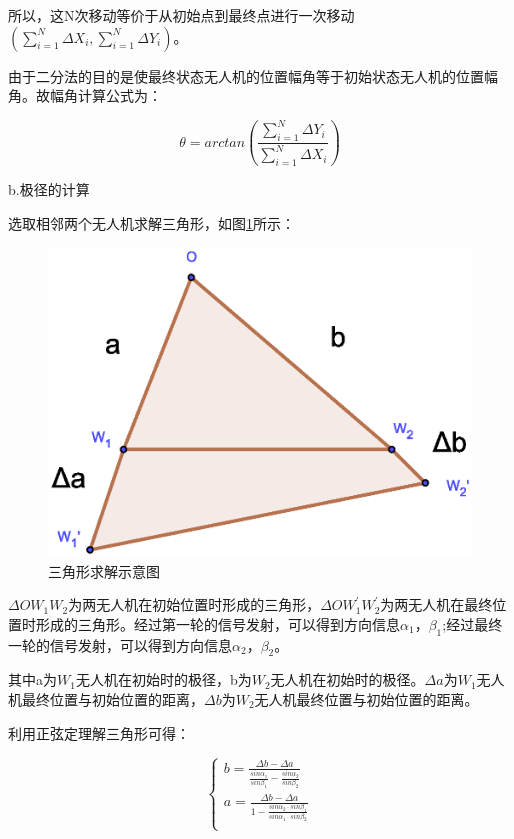 \documentclass{ctexart}
\begin{document}
所以，这N次移动等价于从初始点到最终点进行一次移动$(\sum_{i=1}^{N}\Delta X_i,\sum_{i=1}^{N}\Delta Y_i)$。

由于二分法的目的是使最终状态无人机的位置幅角等于初始状态无人机的位置幅角。故幅角计算公式为：

\begin{equation}
  \theta=arctan(\frac{\sum_{i=1}^{N}\Delta Y_i}{\sum_{i=1}^{N}\Delta X_i})
\end{equation}

b.极径的计算

选取相邻两个无人机求解三角形，如图\ref{三角形求解示意图}所示：


\begin{figure}[H]
  \centering
  \includegraphics[width=0.45\linewidth]{pic/solution.eps}
  \caption{三角形求解示意图}
  \label{三角形求解示意图}
  \end{figure}



$\Delta OW_1W_2$为两无人机在初始位置时形成的三角形，$\Delta OW_1^{'}W_2^{'}$为两无人机在最终位置时形成的三角形。经过第一轮的信号发射，可以得到方向信息$\alpha_1$，$\beta_1$;经过最终一轮的信号发射，可以得到方向信息$\alpha_2$，$\beta_2$。

其中a为$W_1$无人机在初始时的极径，b为$W_2$无人机在初始时的极径。$\Delta a$为$W_1$无人机最终位置与初始位置的距离，$\Delta b$为$W_2$无人机最终位置与初始位置的距离。

利用正弦定理解三角形可得：

\begin{equation}
  \left\{
            \begin{array}{ll}
              b=\frac{\Delta b-\Delta a}{\frac{sin\alpha_1}{sin\beta_1}-\frac{sin\alpha_2}{sin\beta_2}}\\
              a=\frac{\Delta b-\Delta a}{1-\frac{sin\alpha_2\cdot sin\beta_1}{sin\alpha_1\cdot sin\beta_2}}\\


            \end{array}
          \right.
\end{equation}
\end{document}
